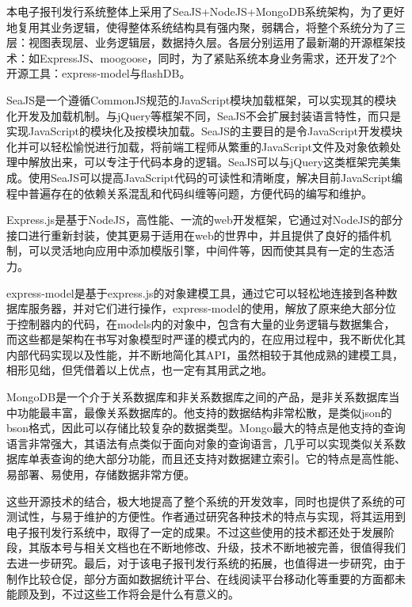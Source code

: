 本电子报刊发行系统整体上采用了SeaJS+NodeJS+MongoDB系统架构，为了更好地复用其业务逻辑，使得整体系统结构具有强内聚，弱耦合，将整个系统分为了三层：视图表现层、业务逻辑层，数据持久层。各层分别运用了最新潮的开源框架技术：如ExpressJS、moogoose，同时，为了紧贴系统本身业务需求，还开发了2个开源工具：express-model与flashDB。

SeaJS是一个遵循CommonJS规范的JavaScript模块加载框架，可以实现其的模块化开发及加载机制。与jQuery等框架不同，SeaJS不会扩展封装语言特性，而只是实现JavaScript的模块化及按模块加载。SeaJS的主要目的是令JavaScript开发模块化并可以轻松愉悦进行加载，将前端工程师从繁重的JavaScript文件及对象依赖处理中解放出来，可以专注于代码本身的逻辑。SeaJS可以与jQuery这类框架完美集成。使用SeaJS可以提高JavaScript代码的可读性和清晰度，解决目前JavaScript编程中普遍存在的依赖关系混乱和代码纠缠等问题，方便代码的编写和维护。

Express.js是基于NodeJS，高性能、一流的web开发框架，它通过对NodeJS的部分接口进行重新封装，使其更易于适用在web的世界中，并且提供了良好的插件机制，可以灵活地向应用中添加模版引擎，中间件等，因而使其具有一定的生态活力。

express-model是基于express.js的对象建模工具，通过它可以轻松地连接到各种数据库服务器，并对它们进行操作，express-model的使用，解放了原来绝大部分位于控制器内的代码，在models内的对象中，包含有大量的业务逻辑与数据集合，而这些都是架构在书写对象模型时严谨的模式内的，在应用过程中，我不断优化其内部代码实现以及性能，并不断地简化其API，虽然相较于其他成熟的建模工具，相形见绌，但凭借着以上优点，也一定有其用武之地。

MongoDB是一个介于关系数据库和非关系数据库之间的产品，是非关系数据库当中功能最丰富，最像关系数据库的。他支持的数据结构非常松散，是类似json的bson格式，因此可以存储比较复杂的数据类型。Mongo最大的特点是他支持的查询语言非常强大，其语法有点类似于面向对象的查询语言，几乎可以实现类似关系数据库单表查询的绝大部分功能，而且还支持对数据建立索引。它的特点是高性能、易部署、易使用，存储数据非常方便。

这些开源技术的结合，极大地提高了整个系统的开发效率，同时也提供了系统的可测试性，与易于维护的方便性。作者通过研究各种技术的特点与实现，将其运用到电子报刊发行系统中，取得了一定的成果。不过这些使用的技术都还处于发展阶段，其版本号与相关文档也在不断地修改、升级，技术不断地被完善，很值得我们去进一步研究。最后，对于该电子报刊发行系统的拓展，也值得进一步研究，由于制作比较仓促，部分方面如数据统计平台、在线阅读平台移动化等重要的方面都未能顾及到，不过这些工作将会是什么有意义的。



\clearpage